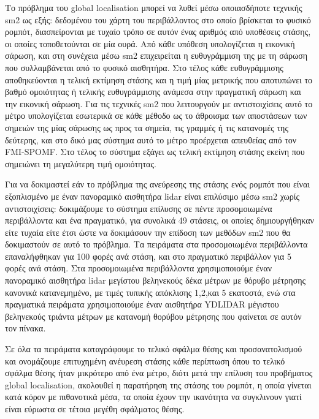 \documentclass[a4paper,10pt]{article}
\begin{document}
Το πρόβλημα του global localisation μπορεί να λυθεί μέσω οποιασδήποτε τεχνικής
sm2 ως εξής: δεδομένου του χάρτη του περιβάλλοντος στο οποίο βρίσκεται το
φυσικό ρομπότ, διασπείρονται με τυχαίο τρόπο σε αυτόν ένας αριθμός από
υποθέσεις στάσης, οι οποίες τοποθετούνται σε μία ουρά. Από κάθε υπόθεση
υπολογίζεται η εικονική σάρωση, και στη συνέχεια μέσω sm2 επιχειρείται η
ευθυγράμμιση της με τη σάρωση που συλλαμβάνεται από το φυσικό αισθητήρα. Στο
τέλος κάθε ευθυγράμμισης αποθηκεύονται η τελική εκτίμηση στάσης και η τιμή μίας
μετρικής που αποτυπώνει το βαθμό ομοιότητας ή τελικής ευθυγράμμισης ανάμεσα
στην πραγματική σάρωση και την εικονική σάρωση.  Για τις τεχνικές sm2 που
λειτουργούν με αντιστοιχίσεις αυτό το μέτρο υπολογίζεται εσωτερικά σε κάθε
μέθοδο ως το άθροισμα των αποστάσεων των σημειών της μίας σάρωσης ως προς τα
σημεία, τις γραμμές ή τις κατανομές της δεύτερης, και στο δικό μας σύστημα αυτό
το μέτρο προέρχεται απευθείας από τον FMI-SPOMF. Στο τέλος το σύστημα εξάγει ως
τελική εκτίμηση στάσης εκείνη που σημειώνει τη μεγαλύτερη τιμή ομοιότητας.

Για να δοκιμαστεί εάν το πρόβλημα της ανεύρεσης της στάσης ενός ρομπότ που
είναι εξοπλισμένο με έναν πανοραμικό αισθητήρα lidar είναι επιλύσιμο μέσω sm2
χωρίς αντιστοιχίσεις: δοκιμάζουμε το σύστημα επίλυσης σε πέντε προσομοιωμένα
περιβάλλοντα και ένα πραγματικό, για συνολικά 49 στάσεις, οι οποίες
δημιουργήθηκαν είτε τυχαία είτε έτσι ώστε να δοκιμάσουν την επίδοση των μεθόδων
sm2 που θα δοκιμαστούν σε αυτό το πρόβλημα. Τα πειράματα στα προσομοιωμένα
περιβάλλοντα επαναλήφθηκαν για 100 φορές ανά στάση, και στο πραγματικό
περιβάλλον για 5 φορές ανά στάση.  Στα προσομοιωμένα περιβάλλοντα
χρησιμοποιούμε έναν πανοραμικό αισθητήρα lidar μεγίστου βεληνεκούς δέκα μέτρων
με θόρυβο μέτρησης κανονικά κατανεμημένο, με τιμές τυπικής απόκλισης 1,2,και 5
εκατοστά, ενώ στα πραγματικά πειράματα χρησιμοποιούμε έναν αισθητήρα YDLIDAR
μέγιστου βεληνεκούς τριάντα μέτρων με κατανομή θορύβου μέτρησης που φαίνεται σε
αυτόν τον πίνακα.

Σε όλα τα πειράματα καταγράφουμε το τελικό σφάλμα θέσης και προσανατολισμού και
ονομάζουμε επιτυχημένη ανέυρεση στάσης κάθε περίπτωση όπου το τελικό σφάλμα
θέσης ήταν μικρότερο από ένα μέτρο, διότι μετά την επίλυση του προβήματος
global localisation, ακολουθεί η παρατήρηση της στάσης του ρομπότ, η οποία
γίνεται κατά κόρον με πιθανοτικά μέσα, τα οποία έχουν την ικανότητα να
συγκλινουν γιατί είναι εύρωστα σε τέτοια μεγέθη σφάλματος θέσης.
\end{document}
